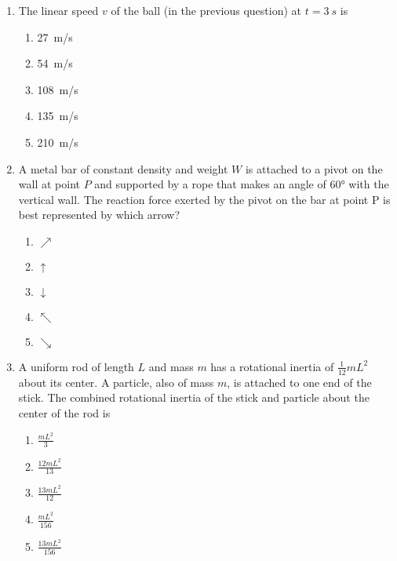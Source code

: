 \documentclass{../../oss-apphys}
\begin{document}
\begin{multicols}{2}
\begin{enumerate}[leftmargin=18pt]
  \item The linear speed $v$ of the ball (in the previous question) at
    $t=\SI{3}{s}$ is
    \begin{enumerate}[noitemsep,topsep=0pt]
    \item\SI{27 }{m/s}
    \item\SI{54 }{m/s}
    \item\SI{108}{m/s}
    \item\SI{135}{m/s}
    \item\SI{210}{m/s}
    \end{enumerate}

  \item A metal bar of constant density and weight $W$ is attached to a pivot on
    the wall at point $P$ and supported by a rope that makes an angle of
    \ang{60} with the vertical wall. The reaction force exerted by the pivot on
    the bar at point P is best represented by which arrow?
    \begin{center}
    \end{center}
    \begin{enumerate}[noitemsep,topsep=0pt]
    \item $\nearrow$
    \item $\uparrow$
    \item $\downarrow$
    \item $\nwarrow$
    \item $\searrow$
    \end{enumerate}

  \item A uniform rod of length $L$ and mass $m$ has a rotational inertia of
    $\displaystyle \frac{1}{12}mL^2$ about its center. A particle, also of mass
    $m$, is attached to one end of the stick. The combined rotational inertia of
    the stick and particle about the center of the rod is
    \begin{center}
    \end{center}
    \begin{enumerate}[noitemsep,topsep=0pt]
    \item$\displaystyle \frac{mL^2}{3}$
    \item$\displaystyle \frac{12mL^2}{13}$
    \item$\displaystyle \frac{13mL^2}{12}$
    \item$\displaystyle \frac{mL^2}{156}$
    \item$\displaystyle \frac{13mL^2}{156}$
    \end{enumerate}


\end{enumerate}
\end{multicols}
\end{document}
